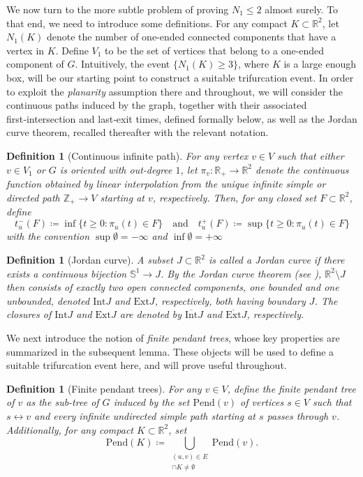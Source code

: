 \documentclass[a4paper, 11pt]{article} %
\theoremstyle{plain}
\newtheorem{definition}[theorem]{Definition}
\newcommand{\backward}{\mathrm{Pend}}
\newcommand{\Int}{\mathrm{Int}}
\newcommand{\clInt}{\overline{\mathrm{Int}}}
\newcommand{\Ext}{\mathrm{Ext}}
\newcommand{\clExt}{\overline{\mathrm{Ext}}}
\newcommand{\R}{\mathbb{R}}
\newcommand{\Z}{\mathbb{Z}}
\newcommand{\1}{\mathds 1}
\numberwithin{equation}{section}
\begin{document}
We now turn to the more subtle problem of proving $N_1\leq 2$ almost surely. To that end, we need to introduce some definitions. For any compact $K\subset\R^2$, let $N_1(K)$ denote the number of one-ended connected components that have a vertex in $K$. Define $V_1$ to be the set of vertices that belong to a one-ended component of $G$. Intuitively, the event $\{N_1(K)\geq3\}$, where $K$ is a large enough box, will be our starting point to construct a suitable trifurcation event. In order to exploit the \emph{planarity} assumption there and throughout, we will consider the continuous paths induced by the graph, together with their associated first‑intersection and last‑exit times, defined formally below, as well as the Jordan curve theorem, recalled thereafter with the relevant notation.


\begin{definition}[Continuous infinite path]
    \label{def_continuous_infinite_path}
    For any vertex $v\in V$ such that either $v\in V_1$ or $G$ is oriented with out-degree $1$, let $\pi_v:\R_+\to\R^2$ denote the continuous function obtained by linear interpolation from the unique infinite simple or directed path $\Z_+\to V$ starting at $v$, respectively. Then, for any closed set $F\subset\R^2$, define
        \[t_u^-(F)\coloneqq\inf\{t\geq0:\pi_u(t)\in F\}\quad\text{and}\quad t_u^+(F)\coloneqq\sup\{t\geq0:\pi_u(t)\in F\}\]
    with the convention $\sup\emptyset=-\infty$ and $\inf\emptyset=+\infty$
\end{definition}


\begin{definition}[Jordan curve]
    A subset $J\subset\R^2$ is called a Jordan curve if there exists a continuous bijection $\mathbb S^1\to J$. By the Jordan curve theorem (see \cite{topology_book}), $\R^2\setminus J$ then consists of exactly two open connected components, one bounded and one unbounded, denoted $\Int J$ and $\Ext J$, respectively, both having boundary $J$. The closures of $\Int J$ and $\Ext J$ are denoted by $\clInt J$ and $\clExt J$, respectively.
\end{definition}


We next introduce the notion of \emph{finite pendant trees}, whose key properties are summarized in the subsequent lemma. These objects will be used to define a suitable trifurcation event here, and will prove useful throughout.


\begin{definition}[Finite pendant trees]
    \label{def_backward_tree}
    For any $v\in V$, define the \emph{finite pendant tree} of $v$ as the sub-tree of $G$ induced by the set $\backward(v)$ of vertices $s\in V$ such that $s\leftrightarrow v$ and every infinite undirected simple path starting at $s$ passes through $v$. Additionally, for any compact $K\subset\R^2$, set
        \[\backward(K)\coloneqq\bigcup_{\substack{(u,v)\in E\\ [u,v]\cap K\neq\emptyset}}\backward(v).\]
\end{definition}
\end{document}
